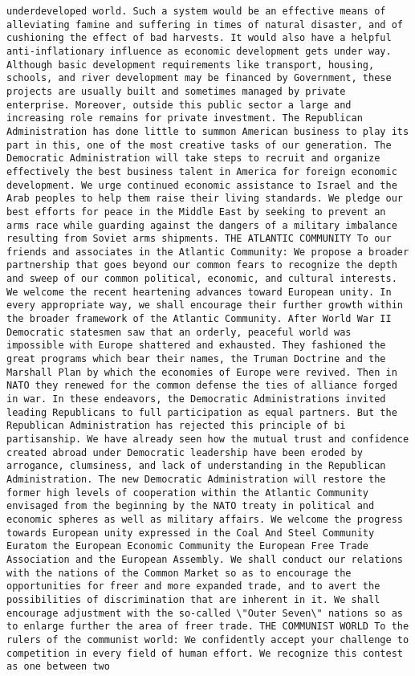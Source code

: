 \documentclass[
]{article}
\begin{document}
\begin{verbatim}
underdeveloped world. Such a system would be an effective means of alleviating famine and suffering in times of natural disaster, and of cushioning the effect of bad harvests. It would also have a helpful anti-inflationary influence as economic development gets under way. Although basic development requirements like transport, housing, schools, and river development may be financed by Government, these projects are usually built and sometimes managed by private enterprise. Moreover, outside this public sector a large and increasing role remains for private investment. The Republican Administration has done little to summon American business to play its part in this, one of the most creative tasks of our generation. The Democratic Administration will take steps to recruit and organize effectively the best business talent in America for foreign economic development. We urge continued economic assistance to Israel and the Arab peoples to help them raise their living standards. We pledge our best efforts for peace in the Middle East by seeking to prevent an arms race while guarding against the dangers of a military imbalance resulting from Soviet arms shipments. THE ATLANTIC COMMUNITY To our friends and associates in the Atlantic Community: We propose a broader partnership that goes beyond our common fears to recognize the depth and sweep of our common political, economic, and cultural interests. We welcome the recent heartening advances toward European unity. In every appropriate way, we shall encourage their further growth within the broader framework of the Atlantic Community. After World War II Democratic statesmen saw that an orderly, peaceful world was impossible with Europe shattered and exhausted. They fashioned the great programs which bear their names, the Truman Doctrine and the Marshall Plan by which the economies of Europe were revived. Then in NATO they renewed for the common defense the ties of alliance forged in war. In these endeavors, the Democratic Administrations invited leading Republicans to full participation as equal partners. But the Republican Administration has rejected this principle of bi partisanship. We have already seen how the mutual trust and confidence created abroad under Democratic leadership have been eroded by arrogance, clumsiness, and lack of understanding in the Republican Administration. The new Democratic Administration will restore the former high levels of cooperation within the Atlantic Community envisaged from the beginning by the NATO treaty in political and economic spheres as well as military affairs. We welcome the progress towards European unity expressed in the Coal And Steel Community Euratom the European Economic Community the European Free Trade Association and the European Assembly. We shall conduct our relations with the nations of the Common Market so as to encourage the opportunities for freer and more expanded trade, and to avert the possibilities of discrimination that are inherent in it. We shall encourage adjustment with the so-called \"Outer Seven\" nations so as to enlarge further the area of freer trade. THE COMMUNIST WORLD To the rulers of the communist world: We confidently accept your challenge to competition in every field of human effort. We recognize this contest as one between two 
\end{verbatim}
\end{document}
